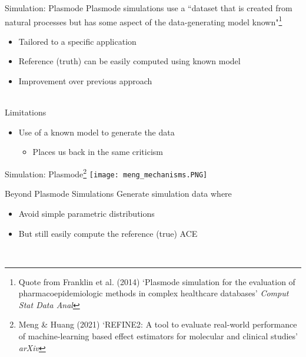 \documentclass{beamer}
\begin{document}
\begin{frame}{Simulation: Plasmode}
	Plasmode simulations use a ``dataset that is created from natural processes but has some aspect of the data-generating model known"\footnote[frame]{Quote from Franklin et al. (2014) `Plasmode simulation for the evaluation of pharmacoepidemiologic methods in complex healthcare databases' \textit{Comput Stat Data Anal}}
	\begin{itemize}
		\item Tailored to a specific application
		\item Reference (truth) can be easily computed using known model
		\item Improvement over previous approach
	\end{itemize}~\\
	Limitations
	\begin{itemize}
		\item Use of a known model to generate the data
		\begin{itemize}
			\item Places us back in the same criticism 
		\end{itemize}
	\end{itemize}
\end{frame}

\begin{frame}{Simulation: Plasmode\footnote[frame]{Meng \& Huang (2021) `REFINE2: A tool to evaluate real-world performance of machine-learning based effect estimators for molecular and clinical studies' \textit{arXiv}}}
	\centering
	\texttt{[image: meng\_mechanisms.PNG]}
\end{frame}

\begin{frame}{Beyond Plasmode Simulations}
	Generate simulation data where 
	\begin{itemize}
		\item Avoid simple parametric distributions
		\item But still easily compute the reference (true) ACE
	\end{itemize}~\\
\end{frame}
\end{document}
